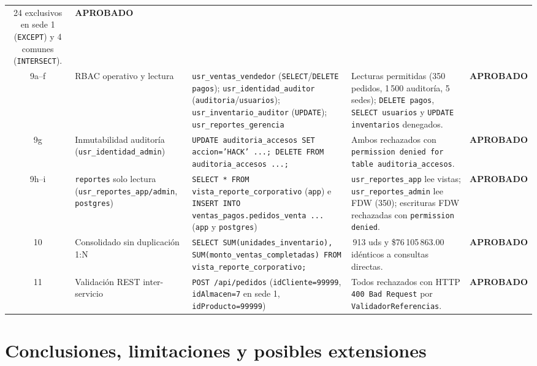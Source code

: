 \documentclass[11pt,oneside]{article}
\newcommand{\okbadge}{\textcolor{ok}{\sffamily\bfseries APROBADO}}
\begin{document}
\begin{center}
{\begin{tabularx}{\linewidth}{@{} c >{\raggedright\arraybackslash}p{2.25cm} >{\ttfamily\raggedright\arraybackslash\hyphenpenalty=10000\exhyphenpenalty=10000}p{4.95cm} >{\raggedright\arraybackslash}X c @{}}
  24 exclusivos en sede 1 (\texttt{EXCEPT}) y 4 comunes (\texttt{INTERSECT}). & \okbadge \\
9a--f & RBAC operativo y lectura &
  \texttt{usr\_ventas\_vendedor} (\texttt{SELECT}/\texttt{DELETE pagos}); \texttt{usr\_identidad\_auditor} (\texttt{auditoria}/\texttt{usuarios}); \texttt{usr\_inventario\_auditor} (\texttt{UPDATE}); \texttt{usr\_reportes\_gerencia} &
  Lecturas permitidas (350 pedidos, 1\,500 auditor\'ia, 5 sedes); \texttt{DELETE pagos}, \texttt{SELECT usuarios} y \texttt{UPDATE inventarios} denegados. & \okbadge \\
9g & Inmutabilidad auditor\'ia (\texttt{usr\_identidad\_admin}) &
  \texttt{UPDATE auditoria\_accesos SET accion='HACK' ...; DELETE FROM auditoria\_accesos ...;} &
  Ambos rechazados con \texttt{permission denied for table auditoria\_accesos}. & \okbadge \\
9h--i & \texttt{reportes} solo lectura (\texttt{usr\_reportes\_app/admin}, \texttt{postgres}) &
  \texttt{SELECT * FROM vista\_reporte\_corporativo} (\texttt{app}) e \texttt{INSERT INTO ventas\_pagos.\allowbreak pedidos\_venta ...} (\texttt{app} y \texttt{postgres}) &
  \texttt{usr\_reportes\_app} lee vistas; \texttt{usr\_reportes\_admin} lee FDW (350); escrituras FDW rechazadas con \texttt{permission denied}. & \okbadge \\
10 & Consolidado sin duplicaci\'on 1:N &
  \texttt{SELECT SUM(unidades\_inventario), SUM(monto\_ventas\_completadas) FROM vista\_reporte\_corporativo;} &
  20\,913 uds y \$76\,105\,863.00 id\'enticos a consultas directas. & \okbadge \\
11 & Validaci\'on REST inter-servicio &
  \texttt{POST /api/pedidos} (\texttt{idCliente=99999}, \texttt{idAlmacen=7} en sede 1, \texttt{idProducto=99999}) &
  Todos rechazados con HTTP \texttt{400 Bad Request} por \texttt{ValidadorReferencias}. & \okbadge \\
\bottomrule
\end{tabularx}}
\end{center}

\section{Conclusiones, limitaciones y posibles extensiones}
\end{document}
